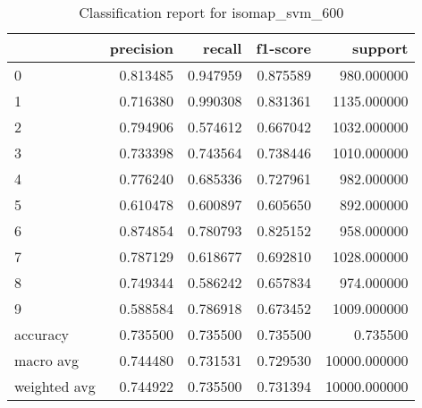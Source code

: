 \begin{table}[htb!]
\centering
\caption{Classification report for isomap_svm_600}
\label{tab:classification-report-isomap_svm_600}
\begin{tabular}{lrrrr}
\toprule
 & precision & recall & f1-score & support \\
\midrule
0 & 0.813485 & 0.947959 & 0.875589 & 980.000000 \\
1 & 0.716380 & 0.990308 & 0.831361 & 1135.000000 \\
2 & 0.794906 & 0.574612 & 0.667042 & 1032.000000 \\
3 & 0.733398 & 0.743564 & 0.738446 & 1010.000000 \\
4 & 0.776240 & 0.685336 & 0.727961 & 982.000000 \\
5 & 0.610478 & 0.600897 & 0.605650 & 892.000000 \\
6 & 0.874854 & 0.780793 & 0.825152 & 958.000000 \\
7 & 0.787129 & 0.618677 & 0.692810 & 1028.000000 \\
8 & 0.749344 & 0.586242 & 0.657834 & 974.000000 \\
9 & 0.588584 & 0.786918 & 0.673452 & 1009.000000 \\
accuracy & 0.735500 & 0.735500 & 0.735500 & 0.735500 \\
macro avg & 0.744480 & 0.731531 & 0.729530 & 10000.000000 \\
weighted avg & 0.744922 & 0.735500 & 0.731394 & 10000.000000 \\
\bottomrule
\end{tabular}
\end{table}
